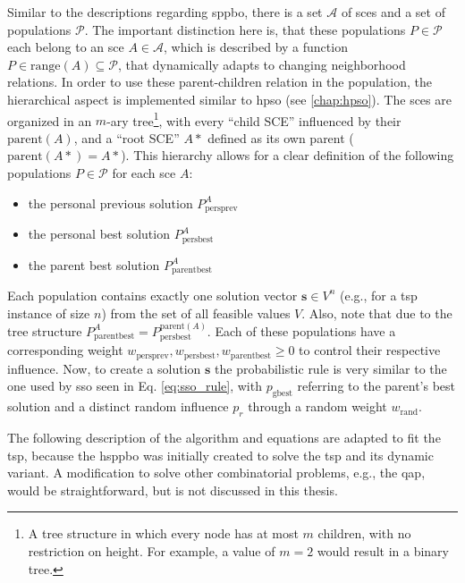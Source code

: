 Similar to the descriptions regarding \gls{sppbo}, there is a set $\mathcal{A}$ of \glspl{sce} and a set of populations $\mathcal{P}$. The important distinction here is, that these populations $P \in \mathcal{P}$ each belong to an \gls{sce} $A \in \mathcal{A}$, which is described by a function $P\in \text{range}(A) \subseteq \mathcal{P}$, that dynamically adapts to changing neighborhood relations. In order to use these parent-children relation in the population, the hierarchical aspect is implemented similar to \gls{hpso} (see \ref{chap:hpso}). The \glspl{sce} are organized in an $m$-ary tree\footnote{A tree structure in which every node has at most $m$ children, with no restriction on height. For example, a value of $m=2$ would result in a binary tree.}, with every \enquote{child SCE} influenced by their $\text{parent}(A)$, and a \enquote{root SCE} $A*$ defined as its own parent ($\text{parent}(A*) = A*$). This hierarchy allows for a clear definition of the following populations $P\in \mathcal{P}$ for each \gls{sce} $A$:
\begin{itemize}
	\item the personal previous solution $P^{A}_{\text{persprev}}$
	\item the personal best solution $P^{A}_{\text{persbest}}$
	\item the parent best solution $P^{A}_{\text{parentbest}}$
\end{itemize}
Each population contains exactly one solution vector $\mathbf{s} \in V^n$ (e.g., for a \gls{tsp} instance of size $n$) from the set of all feasible values $V$. Also, note that due to the tree structure $P^{A}_{\text{parentbest}} = P^{\text{parent}(A)}_{\text{persbest}}$. Each of these populations have a corresponding weight $w_{\text{persprev}}, w_{\text{persbest}}, w_{\text{parentbest}} \geq 0$ to control their respective influence. 
Now, to create a solution $\mathbf{s}$ the probabilistic rule is very similar to the one used by \gls{sso} seen in Eq. \eqref{eq:sso_rule}, with $p_{\text{gbest}}$ referring to the parent's best solution and a distinct random influence $p_r$ through a random weight $w_\text{rand}$.

The following description of the algorithm and equations are adapted to fit the \gls{tsp}, because the \gls{hsppbo} was initially created to solve the \gls{tsp} and its dynamic variant. A modification to solve other combinatorial problems, e.g., the \gls{qap}, would be straightforward, but is not discussed in this thesis.

